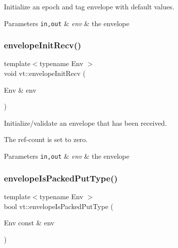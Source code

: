 Initialize an epoch and tag envelope with default values. 


\begin{DoxyParams}[1]{Parameters}
\mbox{\tt in,out}  & {\em env} & the envelope \\
\hline
\end{DoxyParams}
\mbox{\label{namespacevt_ace3e4542ae09ecd9728bea6548d71d5a}} 
\subsubsection{\texorpdfstring{envelope\+Init\+Recv()}{envelopeInitRecv()}}
{\footnotesize\ttfamily template$<$typename Env $>$ \\
void vt\+::envelope\+Init\+Recv (\begin{DoxyParamCaption}\item[{Env \&}]{env }\end{DoxyParamCaption})\hspace{0.3cm}{\ttfamily [inline]}}



Initialize/validate an envelope that has been received. 

The ref-\/count is set to zero.


\begin{DoxyParams}[1]{Parameters}
\mbox{\tt in,out}  & {\em env} & the envelope \\
\hline
\end{DoxyParams}
\mbox{\label{namespacevt_aba8a23bc60c8177816d94e913aed6107}} 
\subsubsection{\texorpdfstring{envelope\+Is\+Packed\+Put\+Type()}{envelopeIsPackedPutType()}}
{\footnotesize\ttfamily template$<$typename Env $>$ \\
bool vt\+::envelope\+Is\+Packed\+Put\+Type (\begin{DoxyParamCaption}\item[{Env const \&}]{env }\end{DoxyParamCaption})\hspace{0.3cm}{\ttfamily [inline]}}



